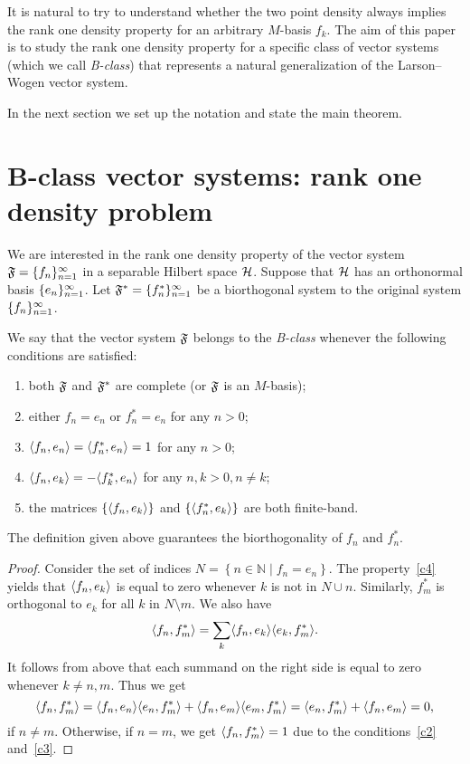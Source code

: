 \documentclass[12pt,oneside,a4paper]{amsart}
\begin{document}
  It is natural to try to understand whether the two point density always implies the rank one density property for an arbitrary $M$-basis $f_k$.
  The aim of this paper is to study the rank one density property for a specific class of vector systems (which we call \emph{B-class})
    that represents a natural generalization of the Larson--Wogen vector system.

  In the next section we set up the notation and state the main theorem.

\bigskip
\section{B-class vector systems: rank one density problem}
    \label{fsys2graphs}
    We are interested in the rank one density property of the vector system $\fsys = \seq{f}$
      in a separable Hilbert space $\cal{H}$.
    Suppose that $\cal{H}$ has an orthonormal basis $\seq{e}$.
    Let $\fstarsys = \{f_n^{*}\}_{n=1}^\infty$ be a biorthogonal system to the original system $\seq{f}$.
    \begin{definition}
      We say that the vector system $\fsys$ belongs to the \emph{B-class} whenever the following conditions are satisfied:
      \begin{enumerate}[label=\textbf{C\arabic*}]
        \item \label{c1} both $\fsys$ and $\fstarsys$ are complete (or $\fsys$ is an $M$-basis);
        \item \label{c2} either $f_n = e_n$ or $f^*_n = e_n$ for any $n > 0$;
        \item \label{c3} $\inner{f_n}{e_n} = \inner{f^*_n}{e_n} = 1$ for any $n > 0$;
        \item \label{c4} $\inner{f_n}{e_k} = -\inner{f^*_k}{e_n}$ for any $n, k > 0, n \neq k$;
        \item \label{c5} the matrices $\{\inner{f_n}{e_k}\}$ and $\{\inner{f^*_n}{e_k}\}$ are both finite-band.
      \end{enumerate}
    \end{definition}
    \begin{prop}
      The definition given above guarantees the biorthogonality of $f_n$ and $f^*_n$.
    \end{prop}
    \begin{proof}
      Consider the set of indices $N = \left\{n \in \mathbb{N} \mid f_n = e_n \right\}$.
      The property~\ref{c4} yields that $\inner{f_n}{e_k}$ is equal to zero whenever $k$ is not in
        $N \cup {n}$.
      Similarly, $f^*_m$ is orthogonal to $e_k$ for all $k$ in $N \setminus {m}$.
      We also have
      \[
        \inner{f_n}{f^*_m} = \sum_{k} \inner{f_n}{e_k} \inner{e_k}{f^*_m}.
      \]
      It follows from above that each summand on the right side is equal to zero whenever $k \neq n, m$.
      Thus we get
      \[
        \inner{f_n}{f^*_m} = \inner{f_n}{e_n} \inner{e_n}{f^*_m} + \inner{f_n}{e_m} \inner{e_m}{f^*_m}
        = \inner{e_n}{f^*_m} + \inner{f_n}{e_m} = 0,
      \]
      if $n \neq m$.
      Otherwise, if $n = m$, we get $\inner{f_n}{f^*_m} = 1$ due to the conditions~\ref{c2} and~\ref{c3}.
    \end{proof}
\end{document}
